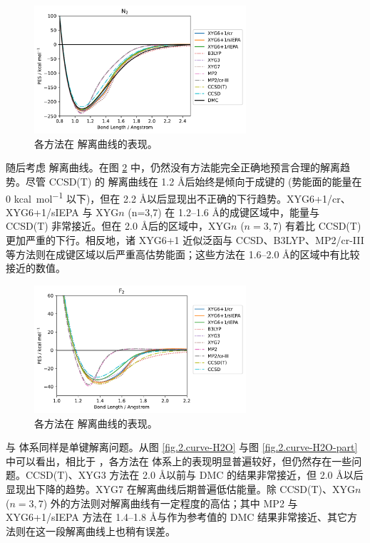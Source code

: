 \begin{figure}[h]
  \centering
  \includegraphics[width=0.7\textwidth]{assets/curve-N2.pdf}
  \caption{各方法在  解离曲线的表现。}
  \label{fig.2.curve-N2}
\end{figure}

随后考虑  解离曲线。在图 \ref{fig.2.curve-F2} 中，仍然没有方法能完全正确地预言合理的解离趋势。尽管 CCSD(T) 的  解离曲线在 1.2 \AA 后始终是倾向于成键的 (势能面的能量在 0 \si{kcal.mol^{-1}} 以下)，但在 2.2 \AA 以后显现出不正确的下行趋势。XYG6+1/cr、XYG6+1/sIEPA 与 XYG$n$ (n=3,7) 在 1.2--1.6 \AA 的成键区域中，能量与 CCSD(T) 非常接近。但在 2.0 \AA 后的区域中，XYG$n$ ($n=3,7$) 有着比 CCSD(T) 更加严重的下行。相反地，诸 XYG6+1 近似泛函与 CCSD、B3LYP、MP2/cr-III 等方法则在成键区域以后严重高估势能面；这些方法在 1.6--2.0 \AA 的区域中有比较接近的数值。

\begin{figure}[h]
  \centering
  \includegraphics[width=0.7\textwidth]{assets/curve-F2.pdf}
  \caption{各方法在  解离曲线的表现。}
  \label{fig.2.curve-F2}
\end{figure}

 与  体系同样是单键解离问题。从图 \ref{fig.2.curve-H2O} 与图 \ref{fig.2.curve-H2O-part} 中可以看出，相比于 ，各方法在  体系上的表现明显普遍较好，但仍然存在一些问题。CCSD(T)、XYG3 方法在 2.0 \AA 以前与 DMC 的结果非常接近，但 2.0 \AA 以后显现出下降的趋势。XYG7 在解离曲线后期普遍低估能量。除 CCSD(T)、XYG$n$ ($n=3, 7$) 外的方法则对解离曲线有一定程度的高估；其中 MP2 与 XYG6+1/sIEPA 方法在 1.4--1.8 \AA 与作为参考值的 DMC 结果非常接近、其它方法则在这一段解离曲线上也稍有误差。

